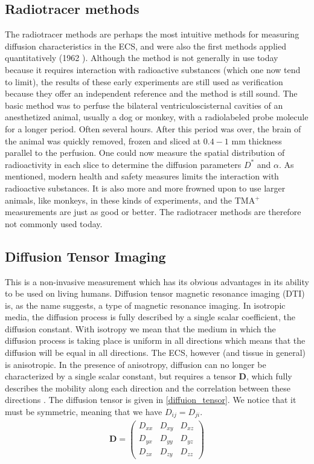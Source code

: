 \documentclass[a4paper,english, 12pt, twoside]{article}
\begin{document}
\subsection{Radiotracer methods}
The radiotracer methods are perhaps the most intuitive methods for measuring diffusion characteristics in the ECS, and were also the first methods applied quantitatively (1962 \cite{nicholson2001diffusion}). 
Although the method is not generally in use today because it requires interaction with radioactive substances (which one now tend to limit), the results of these early experiments are still used as verification because they offer an independent reference and the method is still sound. 
The basic method was to perfuse the bilateral ventriculoscisternal cavities of an anesthetized animal, usually a dog or monkey, with a radiolabeled probe molecule for a longer period. Often several hours. 
After this period was over, the brain of the animal was quickly removed, frozen and sliced at $0.4-1$ mm thickness parallel to the perfusion. 
One could now measure the spatial distribution of radioactivity in each slice to determine the diffusion parameters $D^*$ and $\alpha$. 
As mentioned, modern health and safety measures limits the interaction with radioactive substances. 
It is also more and more frowned upon to use larger animals, like monkeys, in these kinds of experiments, and the TMA$^+$ measurements are just as good or better. 
The radiotracer methods are therefore not commonly used today.

\subsection{Diffusion Tensor Imaging}
This is a non-invasive measurement which has its obvious advantages in its ability to be used on living humans. 
Diffusion tensor magnetic resonance imaging (DTI) is, as the name suggests, a type of magnetic resonance imaging. 
In isotropic media, the diffusion process is fully described by a single scalar coefficient, the diffusion constant. 
With isotropy we mean that the medium in which the diffusion process is taking place is uniform in all directions which means that the diffusion will be equal in all directions. 
The ECS, however (and tissue in general) is anisotropic. 
In the presence of anisotropy, diffusion can no longer be characterized by a single scalar constant, but requires a tensor $\mathbf{D}$, which fully describes the mobility along each direction and the correlation between these directions \cite{le2001diffusion}. 
The diffusion tensor is given in \ref{diffuion_tensor}. We notice that it must be symmetric, meaning that we have $D_{ij} = D_{ji}$.
\begin{align}\label{diffuion_tensor}
 \mathbf{D} = \left(\begin{array}{ccc}
                     D_{xx} & D_{xy} & D_{xz}\\
                     D_{yx} & D_{yy} & D_{yz}\\
                     D_{zx} & D_{zy} & D_{zz}
                    \end{array}\right)
\end{align}
\end{document}
